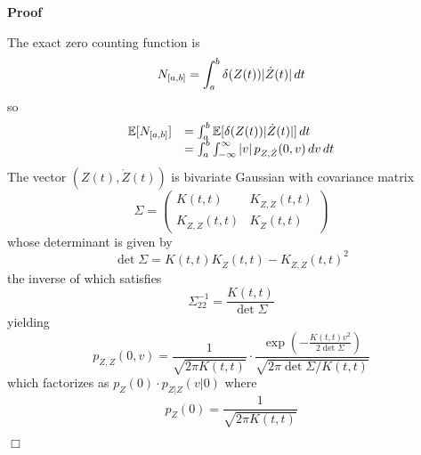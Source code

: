 \documentclass{article}
\newenvironment{proof}{\noindent\textbf{Proof\ }}{\hspace*{\fill}$\Box$\medskip}
\begin{document}
\begin{proof}
  
  \begin{enumerate}
    The exact zero counting function is
    \begin{equation}
      N_{[a, b]} = \int_a^b \delta (Z (t)) | \dot{Z} (t) |  \hspace{0.17em} dt
    \end{equation}
    so
    \begin{equation}
      \label{eq:expectation} \begin{array}{ll}
        \mathbb{E} [N_{[a, b]}] & = \int_a^b \mathbb{E} [\delta (Z (t)) |
        \dot{Z} (t) |]  \hspace{0.17em} dt\\
        & = \int_a^b \int_{- \infty}^{\infty} |v|  \hspace{0.17em} p_{Z,
        \dot{Z}} (0, v)  \hspace{0.17em} dv \hspace{0.17em} dt
      \end{array}
    \end{equation}
    The vector $(Z (t), \dot{Z} (t))$ is bivariate Gaussian with covariance
    matrix
    \begin{equation}
      \Sigma = \left(\begin{array}{cc}
        K (t, t) & K_{Z, \dot{Z}} (t, t)\\
        K_{Z, \dot{Z}} (t, t) & K_{\dot{Z}} (t, t)
      \end{array}\right)
    \end{equation}
    whose determinant is given by
    \begin{equation}
      \det \Sigma = K (t, t) K_{\dot{Z}} (t, t) - K_{Z, \dot{Z}} (t, t)^2
    \end{equation}
    the inverse of which satisfies
    \begin{equation}
      \Sigma^{- 1}_{22} = \frac{K (t, t)}{\det \Sigma}
    \end{equation}
    yielding
    \begin{equation}
      p_{Z, \dot{Z}} (0, v) = \frac{1}{\sqrt{2 \pi K (t, t)}} \cdot \frac{\exp
      \left( - \frac{K (t, t) v^2}{2 \det \Sigma} \right)}{\sqrt{2 \pi \det
      \Sigma / K (t, t)}}
    \end{equation}
    which factorizes as $p_Z (0) \cdot p_{\dot{Z} |Z} (v| 0)$ where
    \begin{equation}
      p_Z (0) = \frac{1}{\sqrt{2 \pi K (t, t)}}
    \end{equation}

\end{enumerate}
\end{proof}
\end{document}
